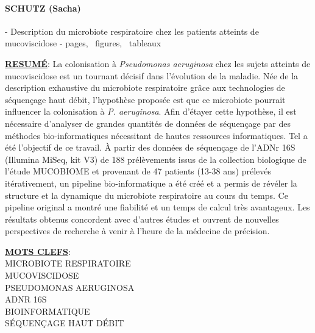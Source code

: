 \documentclass[12pt,a4paper]{article}
\begin{document}
\noindent
\centering

\begin{minipage}[t][2cm]{15cm}
\paragraph{SCHUTZ (Sacha)} - Description du microbiote respiratoire chez les patients atteints de mucoviscidose - \pageref{LastPage} pages, \totalfigures\ figures, \totaltables\ tableaux \\
\end{minipage}


\begin{minipage}[t][9.5cm]{15cm}
\textbf{\underline{RESUMÉ}}:
La colonisation à \textit{Pseudomonas aeruginosa} chez les sujets atteints de mucoviscidose est un tournant décisif dans l'évolution de la maladie. Née de la description exhaustive du microbiote respiratoire grâce aux technologies de séquençage haut débit, l'hypothèse proposée est que ce microbiote pourrait influencer la colonisation à \textit{P. aeruginosa}. Afin d'étayer cette hypothèse, il est nécessaire d'analyser de grandes quantités de données de séquençage par des méthodes bio-informatiques nécessitant de hautes ressources informatiques. Tel a été l'objectif de ce travail. À partir des données de séquençage de l'ADNr 16S (Illumina MiSeq, kit V3) de 188 prélèvements issus de la collection biologique de l'étude MUCOBIOME et provenant de 47 patients (13-38 ans) prélevés itérativement, un pipeline bio-informatique a été créé et a permis de révéler la structure et la dynamique du microbiote respiratoire au cours du temps. Ce pipeline original a montré une fiabilité et un temps de calcul très avantageux. Les résultats obtenus concordent avec d'autres études et ouvrent de nouvelles perspectives de recherche à venir à l'heure de la médecine de précision.
 \end{minipage}


\begin{minipage}[t][4.9cm]{15cm}
\textbf{\underline{MOTS CLEFS}}: \\
MICROBIOTE RESPIRATOIRE\\
MUCOVISCIDOSE\\
PSEUDOMONAS AERUGINOSA\\
ADNR 16S\\
BIOINFORMATIQUE\\
SÉQUENÇAGE HAUT DÉBIT\\
 \end{minipage}
\end{document}

